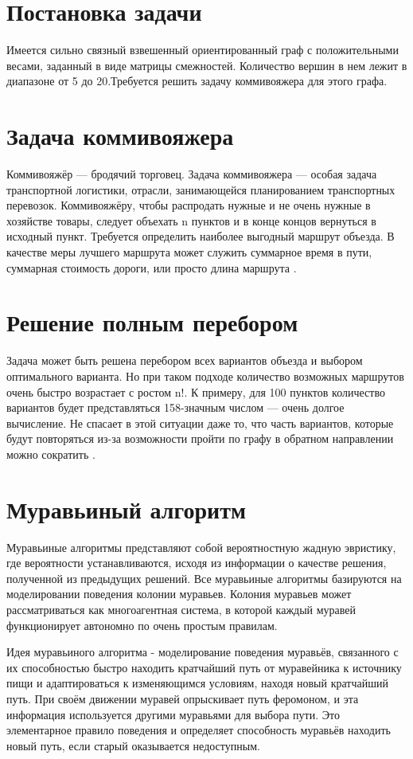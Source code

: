 \documentclass[12pt]{report}
\begin{document}
\section{Постановка задачи} 
Имеется сильно связный взвешенный ориентированный граф \cite{diskr} с положительными весами, заданный в виде матрицы смежностей. Количество вершин в нем лежит в диапазоне от 5 до 20.Требуется решить задачу коммивояжера для этого графа. 
\section{Задача коммивояжера}
 Коммивояжёр — бродячий торговец. Задача коммивояжера — особая задача транспортной логистики, отрасли, занимающейся планированием транспортных перевозок. Коммивояжёру, чтобы распродать нужные и не очень нужные в хозяйстве товары, следует объехать n пунктов и в конце концов вернуться в исходный пункт. Требуется определить наиболее выгодный маршрут объезда. В качестве меры лучшего маршрута может служить суммарное время в пути, суммарная стоимость дороги, или просто длина маршрута \cite{commi2}.

\section{Решение полным перебором}
Задача может быть решена перебором всех вариантов объезда и выбором оптимального варианта. Но при таком подходе количество возможных маршрутов очень быстро возрастает с ростом n!. К примеру, для 100 пунктов количество вариантов будет представляться 158-значным числом — очень долгое вычисление. Не спасает в этой ситуации даже то, что часть вариантов, которые будут повторяться из-за возможности пройти по графу в обратном направлении можно сократить \cite{commi}. %
\section{Муравьиный алгоритм}
Муравьиные алгоритмы представляют собой вероятностную жадную эвристику, где вероятности устанавливаются, исходя из информации о качестве решения, полученной из предыдущих решений. Все муравьиные алгоритмы базируются на моделировании поведения колонии муравьев. Колония муравьев может рассматриваться как многоагентная система, в которой каждый муравей функционирует автономно по очень простым правилам.
		

Идея муравьиного алгоритма - моделирование поведения муравьёв, связанного с их способностью быстро находить кратчайший путь от муравейника к источнику пищи и адаптироваться к изменяющимся условиям, находя новый кратчайший путь\cite{ant1}. При своём движении муравей опрыскивает путь феромоном, и эта информация используется другими муравьями для выбора пути. Это элементарное правило поведения и определяет способность муравьёв находить новый путь, если старый оказывается недоступным.
\end{document}
